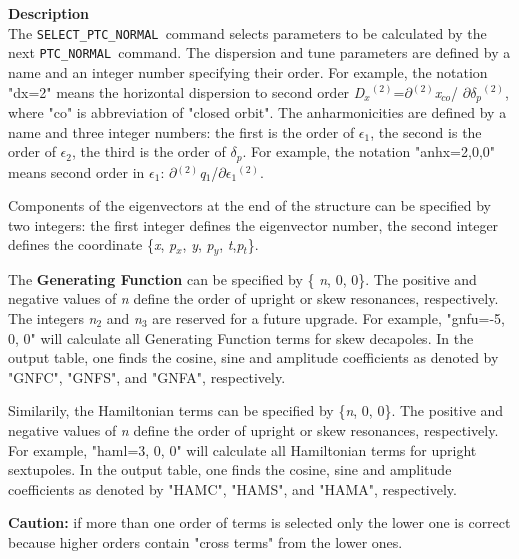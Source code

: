 {\bf Description} \\
The \texttt{SELECT\_PTC\_NORMAL }command selects parameters to be
calculated by the next \texttt{PTC\_NORMAL }command. The dispersion and
tune parameters are defined by a name and an integer number specifying
their order. For example, the notation "dx=2" means the horizontal
dispersion to second order 
\textit{D$_x$}$^{(2)}$=$\partial$$^{(2)}$\textit{x}$_{co}$/
$\partial$\textit{$\delta$}$_\textit{p}$$^{(2)}$, 
where "co" is abbreviation of "closed orbit". The anharmonicities are
defined by a name and three integer numbers: the first is the order of
\textit{$\epsilon$}$_1$, the second is the order of
\textit{$\epsilon$}$_2$, the third is the order of
\textit{$\delta$}$_\textit{p}$. For example, the notation
"anhx=2,0,0" means second order in \textit{$\epsilon$}$_1$:
$\partial$$^{(2)}$\textit{q}$_1$/$\partial$\textit{$\epsilon$}$_1$$^{(2)}$.
        
Components of the eigenvectors at the end of the structure can be
specified by two integers: the first integer defines the
eigenvector number, the second integer defines the coordinate
\{\textit{x}, \textit{p$_x$}, \textit{y}, \textit{p$_y$},
\textit{t},\textit{p$_t$}\}.

The {\bf Generating Function} can be specified by \{ \textit{n}, 0,
0\}. The positive and negative values of \textit{n} define the order of
upright or skew resonances, respectively. The integers \textit{n}$_2$
and \textit{n}$_3$ are reserved for a future upgrade. For example,
"gnfu=-5, 0, 0" will calculate all Generating Function terms for skew 
decapoles. In the output table, one finds the cosine, sine and amplitude
coefficients as denoted by "GNFC", "GNFS", and "GNFA", respectively.

Similarily, the Hamiltonian terms can be specified by \{\textit{n}, 0,
0\}. The positive and negative values of \textit{n} define the order of
upright or skew resonances, respectively. For example, "haml=3, 0, 0"
will calculate all Hamiltonian terms for upright sextupoles. In the
output table, one finds the cosine, sine and amplitude coefficients as
denoted by "HAMC", "HAMS", and "HAMA", respectively. 

{\bf Caution:} if more than one order of terms is selected only the lower one is correct 
because higher orders contain "cross terms" from the lower ones.


